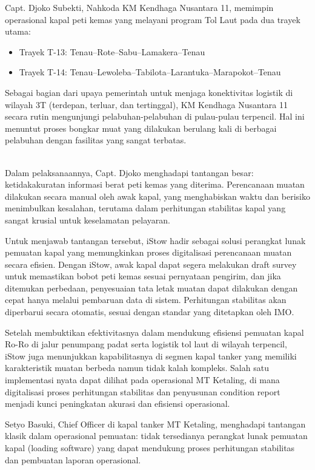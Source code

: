 Capt. Djoko Subekti, Nahkoda KM Kendhaga Nusantara 11, memimpin operasional kapal peti kemas yang melayani program Tol Laut pada dua trayek utama:
\begin{itemize}
    \item Trayek T-13: Tenau--Rote--Sabu--Lamakera--Tenau
    \item Trayek T-14: Tenau--Lewoleba--Tabilota--Larantuka--Marapokot--Tenau
\end{itemize}


Sebagai bagian dari upaya pemerintah untuk menjaga konektivitas logistik di wilayah 3T (terdepan, terluar, dan tertinggal), KM Kendhaga Nusantara 11 secara rutin mengunjungi pelabuhan-pelabuhan di pulau-pulau terpencil. Hal ini menuntut proses bongkar muat yang dilakukan berulang kali di berbagai pelabuhan dengan fasilitas yang sangat terbatas.\\

{
\\
}

Dalam pelaksanaannya, Capt. Djoko menghadapi tantangan besar: ketidakakuratan informasi berat peti kemas yang diterima. Perencanaan muatan dilakukan secara manual oleh awak kapal, yang menghabiskan waktu dan berisiko menimbulkan kesalahan, terutama dalam perhitungan stabilitas kapal yang sangat krusial untuk keselamatan pelayaran.

Untuk menjawab tantangan tersebut, iStow hadir sebagai solusi perangkat lunak pemuatan kapal yang memungkinkan proses digitalisasi perencanaan muatan secara efisien. Dengan iStow, awak kapal dapat segera melakukan draft survey untuk memastikan bobot peti kemas sesuai pernyataan pengirim, dan jika ditemukan perbedaan, penyesuaian tata letak muatan dapat dilakukan dengan cepat hanya melalui pembaruan data di sistem. Perhitungan stabilitas akan diperbarui secara otomatis, sesuai dengan standar yang ditetapkan oleh IMO.

Setelah membuktikan efektivitasnya dalam mendukung efisiensi pemuatan kapal Ro-Ro di jalur penumpang padat serta logistik tol laut di wilayah terpencil, iStow juga menunjukkan kapabilitasnya di segmen kapal tanker yang memiliki karakteristik muatan berbeda namun tidak kalah kompleks. Salah satu implementasi nyata dapat dilihat pada operasional MT Ketaling, di mana digitalisasi proses perhitungan stabilitas dan penyusunan condition report menjadi kunci peningkatan akurasi dan efisiensi operasional.

Setyo Basuki, Chief Officer di kapal tanker MT Ketaling, menghadapi tantangan klasik dalam operasional pemuatan: tidak tersedianya perangkat lunak pemuatan kapal (loading software) yang dapat mendukung proses perhitungan stabilitas dan pembuatan laporan operasional.

